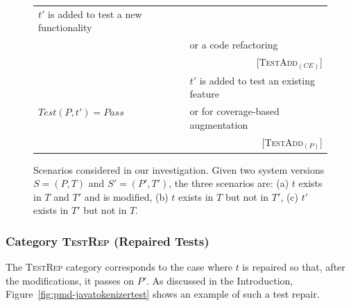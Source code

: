 \documentclass[conference]{IEEEtran}
\newcommand{\lang}[1]{\texttt{\small #1}}
\newcommand{\subject}[1]{\texttt{\small #1}}
\newcommand{\mt}{\mathit}
\newcommand{\pass}{\mt{Pass}}
\newcommand{\testfunc}[2]{\mt{Test(#1, #2)}}
\newcommand{\catrep}{\textsc{TestRep}}
\newcommand{\cataddce}{\textsc{TestAdd}$_\mt{(CE)}$}
\newcommand{\cataddp}{\textsc{TestAdd}$_\mt{(P)}$}
\begin{document}
\begin{figure}[t]
\begin{tabular}{|l||l|}
  $t'$ is added to test a new functionality \\
  & or a code refactoring \\
  & \multicolumn{1}{r|}{\scriptsize [\cataddce{}]} \\
  \hline
  \multirow{3}{*}{$\testfunc{P}{t'} = \pass$} &
  $t'$ is added to test an existing feature\\
  & or for coverage-based augmentation \\
  & \multicolumn{1}{r|}{\scriptsize [\cataddp{}]} \\
  \hline
\end{tabular}
\caption{Scenarios considered in our investigation. Given two system
  versions $S = (P, T)$ and $S' = (P', T')$, the three scenarios are:
  (a) $t$ exists in $T$ and $T'$ and is modified, (b) $t$ exists in
  $T$ but not in $T'$, (c) $t'$ exists in $T'$ but not in $T$.}
\vspace*{-5pt}
\label{fig:study-design}
\end{figure}

\subsubsection{Category \catrep{} (Repaired Tests)}
\label{sec:category-rep}

The \catrep{} category corresponds to the case where $t$ is repaired
so that, after the modifications, it passes on $P'.$ As discussed in
the Introduction, Figure~\ref{fig:pmd-javatokenizertest} shows an
example of such a test repair.


\end{document}
